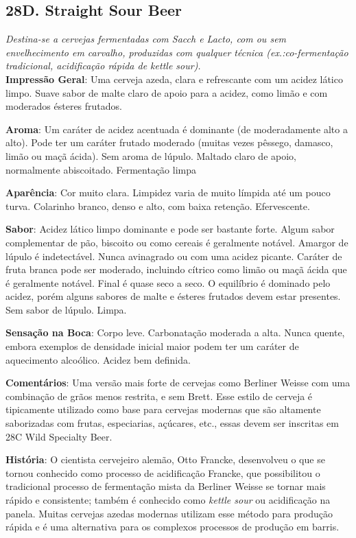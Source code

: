 \subsection*{28D. Straight Sour Beer}
\textit{Destina-se a cervejas fermentadas com Sacch e Lacto, com ou sem envelhecimento em carvalho, produzidas com qualquer técnica (ex.:co-fermentação tradicional, acidificação rápida de kettle sour).}\\
\textbf{Impressão Geral}: Uma cerveja azeda, clara e refrescante com um acidez lático limpo. Suave sabor de malte claro de apoio para a acidez, como limão e com moderados ésteres frutados.

\textbf{Aroma}: Um caráter de acidez acentuada é dominante (de moderadamente alto a alto). Pode ter um caráter frutado moderado (muitas vezes pêssego, damasco, limão ou maçã ácida). Sem aroma de lúpulo. Maltado claro de apoio, normalmente abiscoitado. Fermentação limpa

\textbf{Aparência}: Cor muito clara. Limpidez varia de muito límpida até um pouco turva. Colarinho branco, denso e alto, com baixa retenção. Efervescente.

\textbf{Sabor}: Acidez lático limpo dominante e pode ser bastante forte. Algum sabor complementar de pão, biscoito ou como cereais é geralmente notável. Amargor de lúpulo é indetectável. Nunca avinagrado ou com uma acidez picante. Caráter de fruta branca pode ser moderado, incluindo cítrico como limão ou maçã ácida que é geralmente notável. Final é quase seco a seco. O equilíbrio é dominado pelo acidez, porém alguns sabores de malte e ésteres frutados devem estar presentes. Sem sabor de lúpulo. Limpa.

\textbf{Sensação na Boca}: Corpo leve. Carbonatação moderada a alta. Nunca quente, embora exemplos de densidade inicial maior podem ter um caráter de aquecimento alcoólico. Acidez bem definida.

\textbf{Comentários}: Uma versão mais forte de cervejas como Berliner Weisse com uma combinação de grãos menos restrita, e sem Brett. Esse estilo de cerveja é tipicamente utilizado como base para cervejas modernas que são altamente saborizadas com frutas, especiarias, açúcares, etc., essas devem ser inscritas em 28C Wild Specialty Beer.

\textbf{História}: O cientista cervejeiro alemão, Otto Francke, desenvolveu o que se tornou conhecido como processo de acidificação Francke, que possibilitou o tradicional processo de fermentação mista da Berliner Weisse se tornar mais rápido e consistente; também é conhecido como \textit{kettle sour} ou acidificação na panela. Muitas cervejas azedas modernas utilizam esse método para produção rápida e é uma alternativa para os complexos processos de produção em barris.

